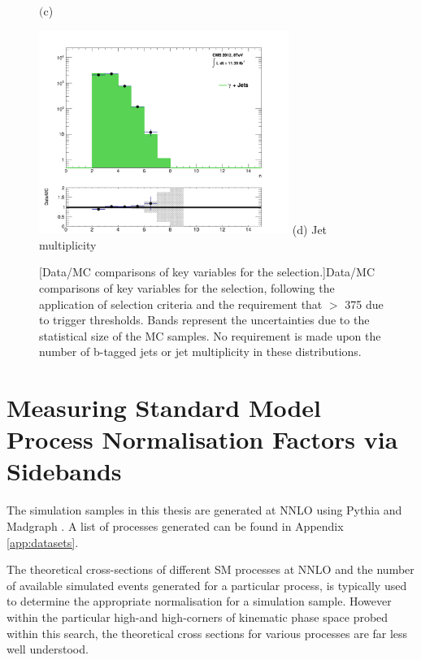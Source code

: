 \begin{itemize}
\begin{figure}[ht]
\begin{minipage}{.48\textwidth}
$\text{(c}$) \alphat
\end{minipage}
\begin{minipage}{.48\textwidth}
\centering
\includegraphics[width = 3.2in]{plots/photon_njet_datamc.pdf}
(d) Jet multiplicity
\end{minipage}
[Data/MC comparisons of key variables for the \gpjets selection.]{Data/MC comparisons of key variables for the \gpjets selection, following the application of selection criteria and the requirement that \theht $>$ 375 \GeV due to trigger thresholds. Bands represent the uncertainties due to the statistical size of the MC samples. No requirement is made upon the number of b-tagged jets or jet multiplicity in these distributions.}\label{fig:photonmcplots}
\end{figure}

\end{itemize}


\section{Measuring Standard Model Process Normalisation Factors via \theht Sidebands}
\label{subsec:mckfactors}

The simulation samples in this thesis are generated at \acf{NNLO} using Pythia and Madgraph \cite{Sjostrand:2006za}. A list of processes generated can be found in Appendix \ref{app:datasets}. 

The theoretical cross-sections of different \ac{SM} processes at \acf{NNLO} and the number of available simulated events generated for a particular process, is typically used to determine the appropriate normalisation for a simulation sample. However within the particular high-\theht and high-\met corners of kinematic phase space probed within this search, the theoretical cross sections for various processes are far less well understood. 

